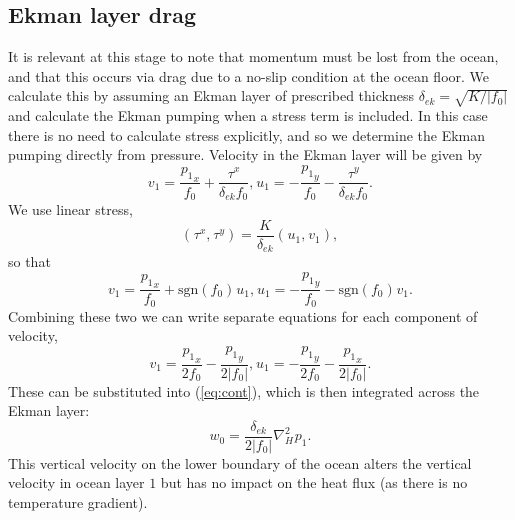 \documentclass[11pt, a4paper,twoside]{article}
\newcommand{\p}[2]{{{}^{#1}p_{#2}}}
\newcommand{\uu}[2]{{{}^{#1}u_{#2}}}
\newcommand{\vv}[2]{{{}^{#1}v_{#2}}}
\newcommand{\ww}[2]{{{}^{#1}w_{#2}}}
\newcommand{\tx}[2]{{}^{#1}\tau^{#2}}
\newcommand{\delek}[0]{\delta_{ek}}
\numberwithin{equation}{section}
\begin{document}
\subsection{Ekman layer drag}
It is relevant at this stage to note that momentum must be lost from the ocean, and that this occurs via drag due to a no-slip condition at the ocean floor.
We calculate this by assuming an Ekman layer of prescribed thickness  $\delek= \sqrt{K/\lvert f_0\rvert}$ and calculate the Ekman pumping when a stress term is included.
In this case there is no need to calculate stress explicitly, and so we determine the Ekman pumping directly from pressure.
Velocity in the Ekman layer will be given by
\begin{subequations}
\begin{equation}
\vv{}{1} = \frac{\p{}{1}_x}{f_0} + \frac{\tx{}{x}}{\delek f_0},
\end{equation}
\begin{equation}
\uu{}{1} = -\frac{\p{}{1}_y}{f_0} - \frac{\tx{}{y}}{\delek f_0}.
\end{equation}
\end{subequations}
We use linear stress,
\begin{equation}
(\tx{}{x},\tx{}{y}) = \frac{K}{\delek}(\uu{}{1},\vv{}{1}),
\end{equation}
so that
\begin{subequations}
\begin{equation}
\vv{}{1} = \frac{\p{}{1}_x}{f_0} + \textrm{sgn}(f_0) \uu{}{1},
\end{equation}
\begin{equation}
\uu{}{1} = -\frac{\p{}{1}_y}{f_0} -  \textrm{sgn}(f_0) \vv{}{1}.
\end{equation}
\end{subequations}
Combining these two we can write separate equations for each component of velocity,
\begin{subequations}
\begin{equation}
\vv{}{1} = \frac{\p{}{1}_x}{2f_0} -\frac{\p{}{1}_y}{2 \lvert f_0 \rvert},
\end{equation}
\begin{equation}
\uu{}{1} = -\frac{\p{}{1}_y}{2f_0} - \frac{\p{}{1}_x}{2 \lvert f_0 \rvert }.
\end{equation}
\end{subequations}
These can be substituted into (\ref{eq:cont}), which is then integrated across the Ekman layer:
\begin{equation}\label{eq:contz}
\ww{}{0} = \frac{\delek}{2 \lvert f_0 \rvert } \nabla_H^2\p{}{1}.
\end{equation}
This vertical velocity on the lower boundary of the ocean alters the vertical velocity in ocean layer $1$ but has no impact on the heat flux (as there is no temperature gradient).
\end{document}
